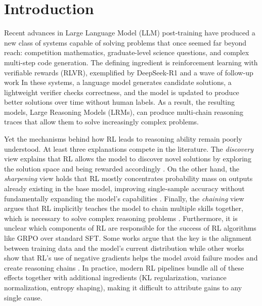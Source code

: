 \documentclass{article}
\newcommand{\el}[1]{\textcolor{purple}{EL: #1}}
\begin{document}
\section{Introduction}
Recent advances in Large Language Model (LLM) post-training have produced a new class of systems capable of solving problems that once seemed far beyond reach: competition mathematics, graduate-level science questions, and complex multi-step code generation. The defining ingredient is reinforcement learning with verifiable rewards (RLVR), exemplified by DeepSeek-R1 \citep{deepseek-aiDeepSeekR1IncentivizingReasoning2025} and a wave of follow-up work \citep{deepscaler2025, zengSimpleRLZooInvestigatingTaming2025}
In these systems, a language model generates candidate solutions, a lightweight verifier checks correctness, and the model is updated to produce better solutions over time without human labels. As a result, the resulting models, Large Reasoning Models (LRMs), can produce multi-chain reasoning traces that allow them to solve increasingly complex problems.

Yet the mechanisms behind how RL leads to reasoning ability remain poorly understood. At least three explanations compete in the literature. The \emph{discovery} view explains that RL allows the model to discover novel solutions by exploring the solution space and being rewarded accordingly \citep{wenReinforcementLearningVerifiable2025}. On the other hand, the \emph{sharpening} view holds that RL mostly concentrates probability mass on outputs already existing in the base model, improving single-sample accuracy without fundamentally expanding the model's capabilities \citep{yueDoesReinforcementLearning2025}. Finally, the \emph{chaining} view argues that RL implicitly teaches the model to chain multiple skills together, which is necessary to solve complex reasoning problems \citep{setlurE3LearningExplore2025}. Furthermore, it is unclear which components of RL are responsible for the success of RL algorithms like GRPO over standard SFT. Some works argue that the key is the alignment between training data and the model's current distribution \citep{chenRetainingDoingRole2025,mingOneTokenRolloutGuiding2026} while
other works show that RL's use of negative gradients helps the model avoid failure modes \citep{tian_learning_2026} and create reasoning chains \citep{setlurE3LearningExplore2025}. In practice, modern RL pipelines bundle all of these effects together with additional ingredients (KL regularization, variance normalization, entropy shaping), making it difficult to attribute gains to any single cause. 
\end{document}
